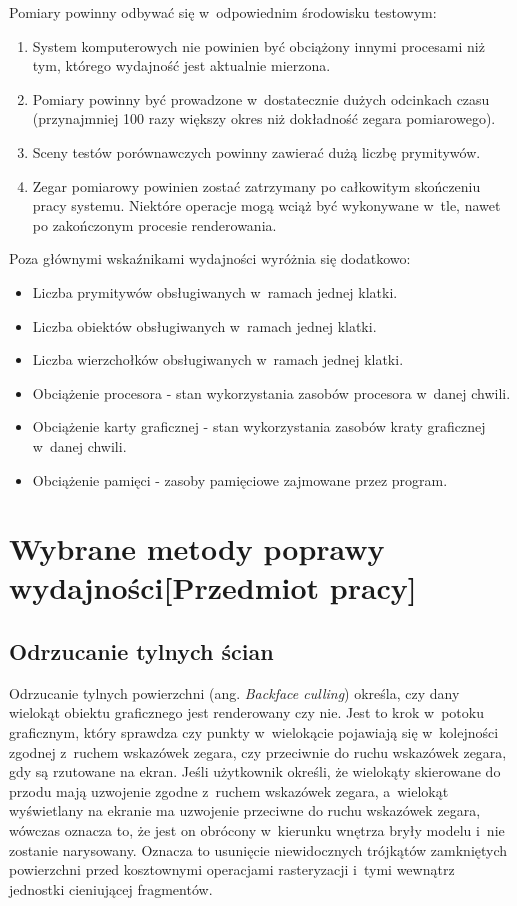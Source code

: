 \documentclass[a4paper,twoside,12pt]{book}
\newcommand{\obcy}[1]{\emph{#1}}
\newcommand{\ang}[1]{{\selectlanguage{british}\obcy{#1}}}
\begin{document}
\vbox{}

Pomiary powinny odbywać się w~odpowiednim środowisku testowym:
\begin{enumerate}
    \item System komputerowych nie powinien być obciążony innymi procesami niż tym, którego wydajność jest aktualnie mierzona.
    \item Pomiary powinny być prowadzone w~dostatecznie dużych odcinkach czasu (przynajmniej 100 razy większy okres niż dokładność zegara pomiarowego).
    \item Sceny testów porównawczych powinny zawierać dużą liczbę prymitywów.
    \item Zegar pomiarowy powinien zostać zatrzymany po całkowitym skończeniu pracy systemu. Niektóre operacje mogą wciąż być wykonywane w~tle, nawet po zakończonym procesie renderowania.
\end{enumerate}

\vbox{}

Poza głównymi wskaźnikami wydajności wyróżnia się dodatkowo:
\begin{itemize}
    \item Liczba prymitywów obsługiwanych w~ramach jednej klatki.
    \item Liczba obiektów obsługiwanych w~ramach jednej klatki.
    \item Liczba wierzchołków obsługiwanych w~ramach jednej klatki.
    \item Obciążenie procesora - stan wykorzystania zasobów procesora w~danej chwili.
    \item Obciążenie karty graficznej - stan wykorzystania zasobów kraty graficznej w~danej chwili.
    \item Obciążenie pamięci - zasoby pamięciowe zajmowane przez program.
\end{itemize}



\chapter{Wybrane metody poprawy wydajności[Przedmiot pracy]}

\section{Odrzucanie tylnych ścian}
Odrzucanie tylnych powierzchni (ang. \ang{Backface culling}) określa, czy dany wielokąt obiektu graficznego jest renderowany czy nie. Jest to krok w~potoku graficznym, który sprawdza czy punkty w~wielokącie pojawiają się w~kolejności zgodnej z~ruchem wskazówek zegara, czy przeciwnie do ruchu wskazówek zegara, gdy są rzutowane na ekran. Jeśli użytkownik określi, że wielokąty skierowane do przodu mają uzwojenie zgodne z~ruchem wskazówek zegara, a~wielokąt wyświetlany na ekranie ma uzwojenie przeciwne do ruchu wskazówek zegara, wówczas oznacza to, że jest on obrócony w~kierunku wnętrza bryły modelu i~nie zostanie narysowany. Oznacza to usunięcie niewidocznych trójkątów zamkniętych powierzchni przed kosztownymi operacjami rasteryzacji i~tymi wewnątrz jednostki cieniującej fragmentów.
\end{document}
